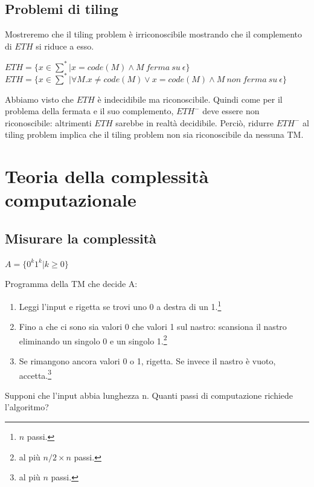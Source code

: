 \documentclass[a4paper, 12pt]{article}
\begin{document}
\subsection{Problemi di tiling}
Mostreremo che il tiling problem \`e irriconoscibile mostrando che il complemento di $ETH$ si riduce a esso.
\begin{center}
$ETH = \{x \in \sum^{*} | x = code(M) \land M\ ferma\ su\ \epsilon\}$\\
$ETH = \{x \in \sum^{*} | \forall M.x \neq code(M) \lor x = code(M) \land M\ non\ ferma\ su\ \epsilon\}$
\end{center}
Abbiamo visto che $ETH$ \`e indecidibile ma riconoscibile. Quindi come per il problema della fermata e il suo complemento, $ETH^{-}$ deve essere non riconoscibile: altrimenti $ETH$ sarebbe in realt\`a decidibile. Perci\`o, ridurre $ETH^{-}$ al tiling problem implica che il tiling problem non sia riconoscibile da nessuna TM.

\newpage
\section{Teoria della complessit\`a computazionale}
\subsection{Misurare la complessit\`a}
\begin{center}
$A = \{0^{k}1^{k} | k \geq 0\}$
\end{center}
Programma della TM che decide A:
\begin{enumerate}
\item Leggi l'input e rigetta se trovi uno 0 a destra di un 1.\footnote{$n$ passi.}
\item Fino a che ci sono sia valori 0 che valori 1 sul nastro: scansiona il nastro eliminando un singolo 0 e un singolo 1.\footnote{al pi\`u $n/2 \times n$ passi.}
\item Se rimangono ancora valori 0 o 1, rigetta. Se invece il nastro \`e vuoto, accetta.\footnote{al pi\`u $n$ passi.}
\end{enumerate}
Supponi che l'input abbia lunghezza n. Quanti passi di computazione richiede l'algoritmo?
\end{document}
